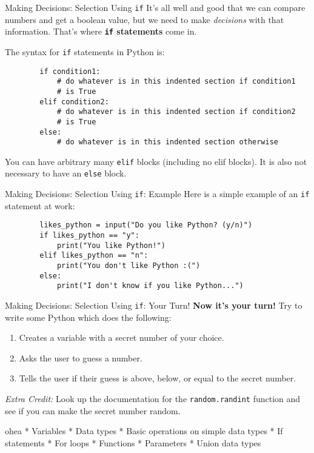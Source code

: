 \documentclass{acm}
\begin{document}
\begin{frame}[fragile]{Making Decisions: Selection Using \texttt{if}}
    It's all well and good that we can compare numbers and get a boolean value,
    but we need to make \textit{decisions} with that information. That's where
    \textbf{\texttt{if} statements} come in.

    \pause
    The syntax for \texttt{if} statements in Python is:
    \begin{verbatim}
        if condition1:
            # do whatever is in this indented section if condition1
            # is True
        elif condition2:
            # do whatever is in this indented section if condition2
            # is True
        else:
            # do whatever is in this indented section otherwise
    \end{verbatim}

    You can have arbitrary many \texttt{elif} blocks (including no elif blocks).
    It is also not necessary to have an \texttt{else} block.
\end{frame}

\begin{frame}[fragile]{Making Decisions: Selection Using \texttt{if}: Example}
    Here is a simple example of an \texttt{if} statement at work:
    \begin{verbatim}
        likes_python = input("Do you like Python? (y/n)")
        if likes_python == "y":
            print("You like Python!")
        elif likes_python == "n":
            print("You don't like Python :(")
        else:
            print("I don't know if you like Python...")
    \end{verbatim}
\end{frame}

\begin{frame}[fragile]{Making Decisions: Selection Using \texttt{if}: Your Turn!}
    \textbf{Now it's your turn!} Try to write some Python which does the
    following:

    \begin{enumerate}
        \item Creates a variable with a secret number of your choice.
        \item Asks the user to guess a number.
        \item Tells the user if their guess is above, below, or equal to the
            secret number.
    \end{enumerate}

    \textit{Extra Credit:} Look up the documentation for the
    \texttt{random.randint} function and see if you can make the secret number
    random.
\end{frame}

\begin{frame}{ohea}
    * Variables
        * Data types
    * Basic operations on simple data types
    * If statements
    * For loops
    * Functions
        * Parameters
    * Union data types
\end{frame}
\end{document}

